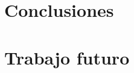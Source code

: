 
\section{Conclusiones}
\label{sec:conclusiones}


\section{Trabajo futuro}
\label{sec:trabajo_futuro}

